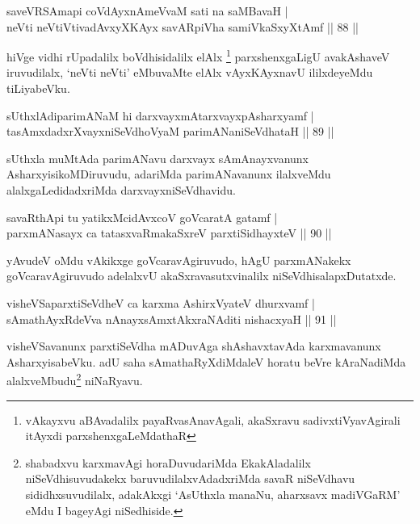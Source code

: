 \begin{shl}
saveVRSAmapi coVdAyxnAmeVvaM sati na saMBavaH |\\
neVti neVtiVtivadAvxyXKAyx savAR\s piVha samiVkaSxyXtAmf \hfill || 88 ||
\end{shl}

\begin{artha}
hiVge vidhi rUpadalilx boVdhisidalilx elAlx \footnote[1]{vAkayxvu aBAvadalilx payaRvasAnavAgali, akaSxravu sadivxtiVyavAgirali itAyxdi parxshenxgaLeMdathaR} parxshenxgaLigU avakAshaveV iruvudilalx, `neVti neVti' eMbuvaMte elAlx vAyxKAyxnavU ililxdeyeMdu tiLiyabeVku.
\end{artha}%

\begin{shl}
sUthxlAdiparimANaM hi darxvayxmAtarxvayxpAsharxyamf |\\
tasAmxdadxrXvayxniSeVdhoV\s yaM parimANaniSeVdhataH \hfill || 89 ||
\end{shl}

\begin{artha}
sUthxla muMtAda parimANavu darxvayx sAmAnayxvanunx AsharxyisikoMDiruvudu, adariMda parimANavanunx ilalxveMdu alalxgaLedidadxriMda darxvayxniSeVdhavidu.
\end{artha}

\begin{shl}
savaRthA\s pi tu yatikxMcidAvxcoV goVcaratA gatamf |\\
parxmANasayx ca tatasxvaRmakaSxreV parxtiSidhayxteV \hfill || 90 ||
\end{shl}

\begin{artha}
yAvudeV oMdu vAkikxge goVcaravAgiruvudo, hAgU parxmANakekx goVcaravAgiruvudo adelalxvU akaSxravasutxvinalilx niSeVdhisalapxDutatxde.
\end{artha}


\begin{shl}
visheVSaparxtiSeVdheV ca karxma AshirxVyateV dhurxvamf |\\
sAmathAyxRdeVva nAnayxsAmxtAkxraNAditi nishacxyaH \hfill || 91 ||
\end{shl}

\begin{artha}
visheVSavanunx parxtiSeVdha mADuvAga shAshavxtavAda karxmavanunx AsharxyisabeVku. adU saha sAmathaRyXdiMdaleV horatu beVre kAraNadiMda alalxveMbudu\footnote[1]{shabadxvu karxmavAgi horaDuvudariMda EkakAladalilx niSeVdhisuvudakekx baruvudilalxvAdadxriMda savaR niSeVdhavu sididhxsuvudilalx, adakAkxgi `AsUthxla manaNu, aharxsavx madiVGaRM' eMdu I bageyAgi niSedhiside.} niNaRyavu.
\end{artha}


